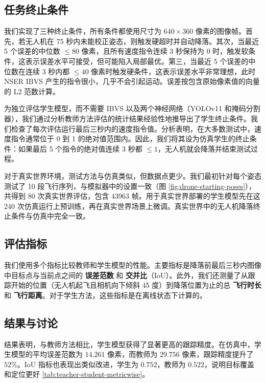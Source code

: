 \documentclass[10pt,twocolumn,letterpaper]{article}
\begin{document}
\subsection{任务终止条件}
\label{subsed:experiments-termination-conditions}
我们实现了三种终止条件，所有条件都使用尺寸为 $640 \times 360$ 像素的图像帧。首先，若无人机在 75 秒内未能校正姿态，则触发硬超时并自动降落。其次，当最近 5 个误差的中位数 $\leq 80$ 像素，且所有速度指令连续 3 秒保持为 0 时，触发软条件，这表示误差水平可接受，但可能陷入局部最优。第三，当最近 5 个误差的中位数在连续 3 秒内都 $\leq 40$ 像素时触发硬条件，这表示误差水平非常理想，此时 NSER IBVS 产生的指令很小，几乎不会引起运动。误差按包含原始像素值的向量的 L2 范数计算。

为独立评估学生模型，而不需要 IBVS 以及两个神经网络（YOLOv11 和掩码分割器），我们通过分析教师方法评估的统计结果经验性地推导出了学生终止条件。我们检查了每次评估运行最后三秒内的速度指令值。分析表明，在大多数测试中，速度指令通常位于 0 到 1 的绝对值范围内。因此，我们将其设为仿真学生的终止条件：如果最后 5 个指令的绝对值连续 3 秒都 $\leq 1$，无人机就会降落并结束测试过程。

对于真实世界环境，测试方法与仿真类似，但数据点更少。我们最初针对每个姿态测试了 10 段飞行序列，与模拟器中的设置一致（图 \ref{fig:drone-starting-poses}），共得到 80 次真实世界评估，包含 $43963$ 帧。用于真实世界部署的学生模型先在这 240 次仿真运行上预训练，再在真实世界场景上微调。真实世界中的无人机降落终止条件与仿真中完全一致。


\subsection{评估指标}
\label{subsec:experiments-metrics}
我们使用多个指标比较教师和学生模型的性能。主要指标是降落前最后三秒内图像中目标点与当前点之间的 \textbf{误差范数} 和 \textbf{交并比}（IoU）。此外，我们还测量了从跟踪开始的位置（无人机起飞且相机向下倾斜 45 度）到降落位置为止的总 \textbf{飞行时长} 和 \textbf{飞行距离}。对于学生方法，这些指标是在离线状态下计算的。

\subsection{结果与讨论}
\label{sec:discussions-results}
结果表明，与教师方法相比，学生模型获得了显著更高的跟踪精度。在仿真中，学生模型的平均误差范数为 $14.261$ 像素，而教师为 $29.756$ 像素，跟踪精度提升了 $52\%$。IoU 指标也表现出类似改进，学生为 $0.752$，教师为 $0.522$，说明目标覆盖和定位更好 \ref{tab:teacher-student-metricwise}。
\end{document}
